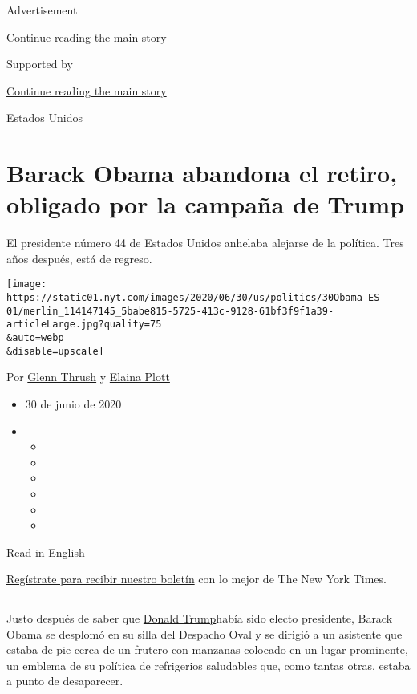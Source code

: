 Advertisement

\protect\hyperlink{after-top}{Continue reading the main story}

Supported by

\protect\hyperlink{after-sponsor}{Continue reading the main story}

Estados Unidos

\hypertarget{barack-obama-abandona-el-retiro-obligado-por-la-campauxf1a-de-trump}{%
\section{Barack Obama abandona el retiro, obligado por la campaña de
Trump}\label{barack-obama-abandona-el-retiro-obligado-por-la-campauxf1a-de-trump}}

El presidente número 44 de Estados Unidos anhelaba alejarse de la
política. Tres años después, está de regreso.

\texttt{[image: https://static01.nyt.com/images/2020/06/30/us/politics/30Obama-ES-01/merlin\_114147145\_5babe815-5725-413c-9128-61bf3f9f1a39-articleLarge.jpg?quality=75\\\&auto=webp\\\&disable=upscale]}

Por \href{https://www.nytimes.com/by/glenn-thrush}{Glenn Thrush} y
\href{https://www.nytimes.com/by/elaina-plott}{Elaina Plott}

\begin{itemize}
\item
  30 de junio de 2020
\item
  \begin{itemize}
  \item
  \item
  \item
  \item
  \item
  \item
  \end{itemize}
\end{itemize}

\href{https://www.nytimes.com/2020/06/28/us/politics/obama-biden-trump.html}{Read
in English}

\href{https://www.nytimes.com/newsletters/el-times}{Regístrate para
recibir nuestro boletín} con lo mejor de The New York Times.

\begin{center}\rule{0.5\linewidth}{\linethickness}\end{center}

Justo después de saber que
\href{https://www.nytimes.com/es/2020/06/22/espanol/donald-trump-2020-tulsa.html}{Donald
Trump}había sido electo presidente, Barack Obama se desplomó en su silla
del Despacho Oval y se dirigió a un asistente que estaba de pie cerca de
un frutero con manzanas colocado en un lugar prominente, un emblema de
su política de refrigerios saludables que, como tantas otras, estaba a
punto de desaparecer.

